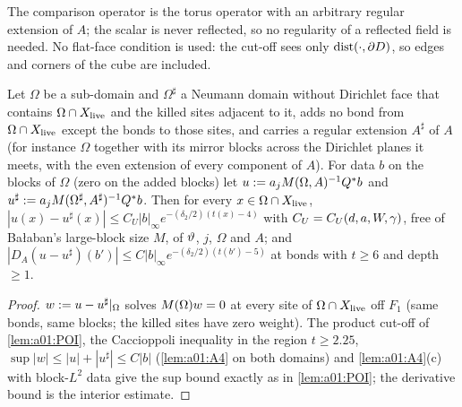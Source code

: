 The comparison operator is the torus operator with an arbitrary regular extension of $A$; the scalar is never reflected, so no regularity of a reflected field is needed. No flat-face condition is used: the cut-off sees only $\operatorname{dist}(\cdot,\partial D)$, so edges and corners of the cube are included.

\begin{lemma}\label{lem:a01:LOC}
Let $\Omega$ be a sub-domain and $\Omega^\sharp$ a Neumann domain without Dirichlet face that contains $\Omega\cap X_{\mathrm{live}}$ and the killed sites adjacent to it, adds no bond from $\Omega\cap X_{\mathrm{live}}$ except the bonds to those sites, and carries a regular extension $A^\sharp$ of $A$ (for instance $\Omega$ together with its mirror blocks across the Dirichlet planes it meets, with the even extension of every component of $A$). For data $b$ on the blocks of $\Omega$ (zero on the added blocks) let $u:= a_jM(\Omega,A)^{-1}Q^*b$ and $u^\sharp:= a_jM(\Omega^\sharp,A^\sharp)^{-1}Q^*b$. Then for every $x\in\Omega\cap X_{\mathrm{live}}$, $|u(x)-u^\sharp(x)|\le C_U|b|_\infty e^{-(\delta_2/2)(t(x)-4)}$ with $C_U=C_U(d,a,W,\gamma)$, free of Ba{\l}aban's large-block size $M$, of $\vartheta$, $j$, $\Omega$ and $A$; and $|D_A(u-u^\sharp)(b')|\le C|b|_\infty e^{-(\delta_2/2)(t(b')-5)}$ at bonds with $t\ge6$ and depth $\ge1$.
\end{lemma}
\begin{proof}
$w:= u-u^\sharp|_\Omega$ solves $M(\Omega)w=0$ at every site of $\Omega\cap X_{\mathrm{live}}$ off $F_1$ (same bonds, same blocks; the killed sites have zero weight). The product cut-off of \cref{lem:a01:POI}, the Caccioppoli inequality in the region $t\ge2.25$, $\sup|w|\le|u|+|u^\sharp|\le C|b|$ (\cref{lem:a01:A4} on both domains) and \cref{lem:a01:A4}(c) with block-$L^2$ data give the sup bound exactly as in \cref{lem:a01:POI}; the derivative bound is the interior estimate.
\end{proof}

